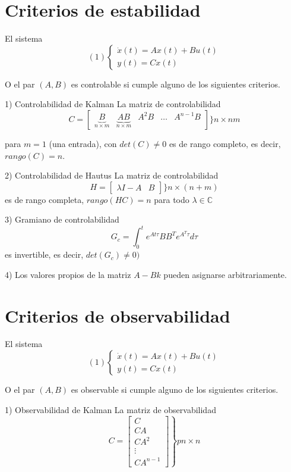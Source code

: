 \section{Criterios de estabilidad}

El sistema 
\[
    (1)
    \left\{
        \begin{array}{lll}
            \dot{x}(t) = Ax(t) + Bu(t)\\
            y(t) = Cx(t)
        \end{array}
    \right.
\]

O el par \( (A, B)\) es controlable si cumple alguno de los siguientes criterios.

1) Controlabilidad de Kalman
La matriz de controlabilidad
\[
    C = 
    \begin{bmatrix}
        \underbrace{B}_{n\times m} &
        \underbrace{AB}_{n\times m} &
        A^{2}B & \ldots & A^{n-1}B
    \end{bmatrix}
    \Big\} n\times nm
\]

para \( m=1 \) (una entrada), con \( det(C)\not= 0 \) es de rango completo, es decir, \( rango(C)=n \).

2) Controlabilidad de Hautus
La matriz de controlabilidad
\[
    H =
    \begin{bmatrix}
        \lambda I-A & B
    \end{bmatrix}
    \Big \} n\times(n+m)
\]
es de rango completa, \( rango(HC)=n \) para todo \( \lambda \in \mathbb{C} \)

3) Gramiano de controlabilidad
\[
    G_{c} = \int_{0}^{t} e^{At\tau}BB^{T}e^{A^{T}\tau}d\tau
\]
es invertible, es decir, \( det(G_{c}) \not= 0) \)

4) Los valores propios de la matriz \( A-Bk \) pueden asignarse arbitrariamente.

\section{Criterios de observabilidad}
El sistema 
\[
    (1)
    \left\{
        \begin{array}{lll}
            \dot{x}(t) = Ax(t) + Bu(t)\\
            y(t) = Cx(t)
        \end{array}
    \right.
\]

O el par \( (A, B)\) es observable si cumple alguno de los siguientes criterios.

1) Observabilidad de Kalman
La matriz de observabilidad
\[
    C = 
    \left.
    \begin{bmatrix}
        C \\
        CA \\
        CA^{2} \\ \vdots \\
        CA^{n-1}
    \end{bmatrix}
    \right\} pn\times n
\]

